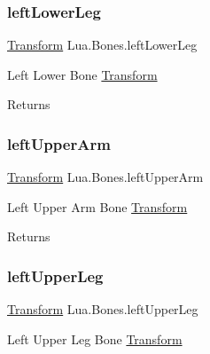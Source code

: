 \subsubsection{\texorpdfstring{leftLowerLeg}{leftLowerLeg}}
{\footnotesize\ttfamily \mbox{\hyperlink{class_lua_1_1_transform}{Transform}} Lua.\+Bones.\+left\+Lower\+Leg\hspace{0.3cm}{\ttfamily [get]}}



Left Lower Bone \mbox{\hyperlink{class_lua_1_1_transform}{Transform}} 

\begin{DoxyReturn}{Returns}

\end{DoxyReturn}
\mbox{\label{class_lua_1_1_bones_a3a134608353ae7791f13f2cce227ce7b}} 
\subsubsection{\texorpdfstring{leftUpperArm}{leftUpperArm}}
{\footnotesize\ttfamily \mbox{\hyperlink{class_lua_1_1_transform}{Transform}} Lua.\+Bones.\+left\+Upper\+Arm\hspace{0.3cm}{\ttfamily [get]}}



Left Upper Arm Bone \mbox{\hyperlink{class_lua_1_1_transform}{Transform}} 

\begin{DoxyReturn}{Returns}

\end{DoxyReturn}
\mbox{\label{class_lua_1_1_bones_a260c8638158d2f0580c1275351f4a1f2}} 
\subsubsection{\texorpdfstring{leftUpperLeg}{leftUpperLeg}}
{\footnotesize\ttfamily \mbox{\hyperlink{class_lua_1_1_transform}{Transform}} Lua.\+Bones.\+left\+Upper\+Leg\hspace{0.3cm}{\ttfamily [get]}}



Left Upper Leg Bone \mbox{\hyperlink{class_lua_1_1_transform}{Transform}} 

